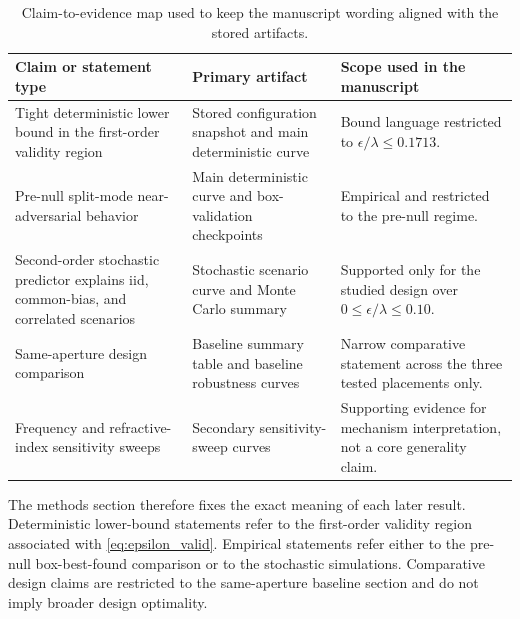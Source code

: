 \begin{table}[H]
\centering
\small
\caption{Claim-to-evidence map used to keep the manuscript wording aligned with the stored artifacts.}
\label{tab:claim_map}
\begin{tabularx}{\textwidth}{>{\raggedright\arraybackslash}p{} >{\raggedright\arraybackslash}p{} >{\raggedright\arraybackslash}X}
\toprule
Claim or statement type & Primary artifact & Scope used in the manuscript \\
\midrule
Tight deterministic lower bound in the first-order validity region & Stored configuration snapshot and main deterministic curve & Bound language restricted to $\epsilon/\lambda \le 0.1713$. \\
Pre-null split-mode near-adversarial behavior & Main deterministic curve and box-validation checkpoints & Empirical and restricted to the pre-null regime. \\
Second-order stochastic predictor explains iid, common-bias, and correlated scenarios & Stochastic scenario curve and Monte Carlo summary & Supported only for the studied design over $0 \le \epsilon/\lambda \le 0.10$. \\
Same-aperture design comparison & Baseline summary table and baseline robustness curves & Narrow comparative statement across the three tested placements only. \\
Frequency and refractive-index sensitivity sweeps & Secondary sensitivity-sweep curves & Supporting evidence for mechanism interpretation, not a core generality claim. \\
\bottomrule
\end{tabularx}
\end{table}

The methods section therefore fixes the exact meaning of each later result. Deterministic lower-bound statements refer to the first-order validity region associated with \eqref{eq:epsilon_valid}. Empirical statements refer either to the pre-null box-best-found comparison or to the stochastic simulations. Comparative design claims are restricted to the same-aperture baseline section and do not imply broader design optimality.
